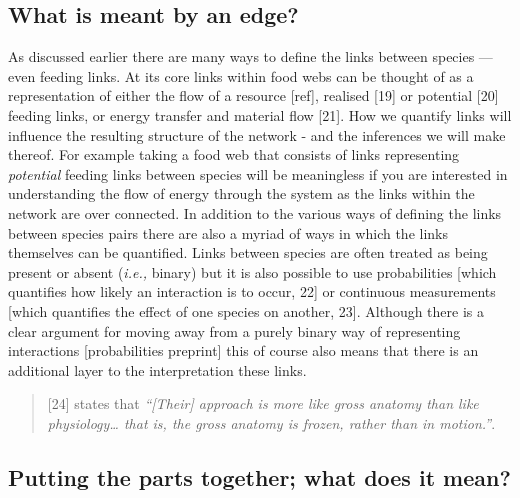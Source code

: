 \documentclass[
]{article}
\begin{document}
\subsection{What is meant by an edge?}\label{what-is-meant-by-an-edge}

As discussed earlier there are many ways to define the links between
species --- even feeding links. At its core links within food webs can
be thought of as a representation of either the flow of a resource
{[}ref{]}, realised {[}19{]} or potential {[}20{]} feeding links, or
energy transfer and material flow {[}21{]}. How we quantify links will
influence the resulting structure of the network - and the inferences we
will make thereof. For example taking a food web that consists of links
representing \emph{potential} feeding links between species will be
meaningless if you are interested in understanding the flow of energy
through the system as the links within the network are over connected.
In addition to the various ways of defining the links between species
pairs there are also a myriad of ways in which the links themselves can
be quantified. Links between species are often treated as being present
or absent (\emph{i.e.,} binary) but it is also possible to use
probabilities {[}which quantifies how likely an interaction is to occur,
22{]} or continuous measurements {[}which quantifies the effect of one
species on another, 23{]}. Although there is a clear argument for moving
away from a purely binary way of representing interactions
{[}probabilities preprint{]} this of course also means that there is an
additional layer to the interpretation these links.

\begin{quote}
{[}24{]} states that \emph{``{[}Their{]} approach is more like gross
anatomy than like physiology\ldots{} that is, the gross anatomy is
frozen, rather than in motion.''}.
\end{quote}

\subsection{Putting the parts together; what does it
mean?}\label{putting-the-parts-together-what-does-it-mean}
\end{document}
